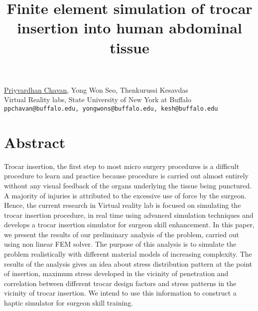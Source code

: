 \title{Finite element simulation of trocar insertion into human abdominal tissue}
\author{} \institute{}
\maketitle

\begin{center}
{\large \underline{Priyvardhan Chavan}, Yong Won Seo, Thenkurussi Kesavdas}\\
{\large Virtual Reality labs, State University of New York at Buffalo}\\
{\tt ppchavan@buffalo.edu, yongwons@buffalo.edu, kesh@buffalo.edu}
\end{center}

\section*{Abstract}
Trocar insertion, the first step to most micro surgery procedures is a difficult procedure to learn and practice because procedure is carried out almost entirely without any visual feedback of the organs underlying the tissue being punctured. A majority of injuries is attributed to the excessive use of force by the surgeon. Hence, the current research in Virtual reality lab is focused on simulating the trocar insertion procedure, in real time using advanced simulation techniques and develops a trocar insertion simulator for surgeon skill enhancement. In this paper, we present the results of our preliminary analysis of the problem, carried out using non linear FEM solver. The purpose of this analysis is to simulate the problem realistically with different material models of increasing complexity. The results of the analysis gives an idea about stress distribution pattern at the point of insertion, maximum stress developed in the vicinity of penetration and correlation between different trocar design factors and stress patterns in the vicinity of trocar insertion. We intend to use this information to construct a haptic simulator for surgeon skill training.

